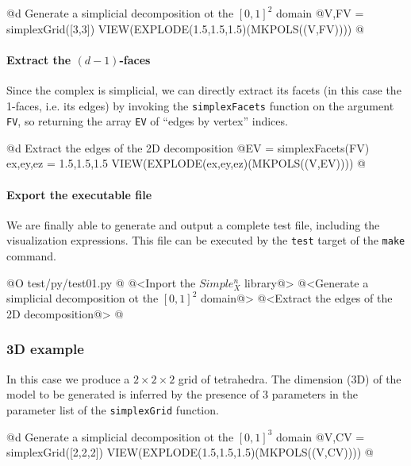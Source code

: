 \documentclass[11pt,oneside]{article}	%
\begin{document}
@d Generate a simplicial decomposition ot the $[0,1]^2$ domain
@{V,FV = simplexGrid([3,3])
VIEW(EXPLODE(1.5,1.5,1.5)(MKPOLS((V,FV))))
@}

\paragraph{Extract the $(d-1)$-faces}
Since the complex is simplicial, we can directly extract its facets (in this case the 1-faces, i.e. its edges) by invoking the \texttt{simplexFacets} function on the argument \texttt{FV}, so returning the array \texttt{EV} of ``edges by vertex'' indices. 

@d Extract the edges of the 2D decomposition
@{EV = simplexFacets(FV)
ex,ey,ez = 1.5,1.5,1.5
VIEW(EXPLODE(ex,ey,ez)(MKPOLS((V,EV))))
@}

\paragraph{Export the executable file}
We are finally able to generate and output a complete test file, including the visualization expressions. This file can be executed by the \texttt{test} target of the \texttt{make} command.

@O test/py/test01.py
@{
@<Inport the $Simple_X^n$ library@>
@<Generate a simplicial decomposition ot the $[0,1]^2$ domain@>
@<Extract the edges of the 2D decomposition@>
@}

\subsubsection{3D example}

In this case we produce a $2\times 2\times 2$ grid of tetrahedra. The dimension (3D) of the model to be generated is inferred by the presence of 3 parameters in the parameter list of the \texttt{simplexGrid} function. 

@d Generate a simplicial decomposition ot the $[0,1]^3$ domain
@{V,CV = simplexGrid([2,2,2])
VIEW(EXPLODE(1.5,1.5,1.5)(MKPOLS((V,CV))))
@}
\end{document}
